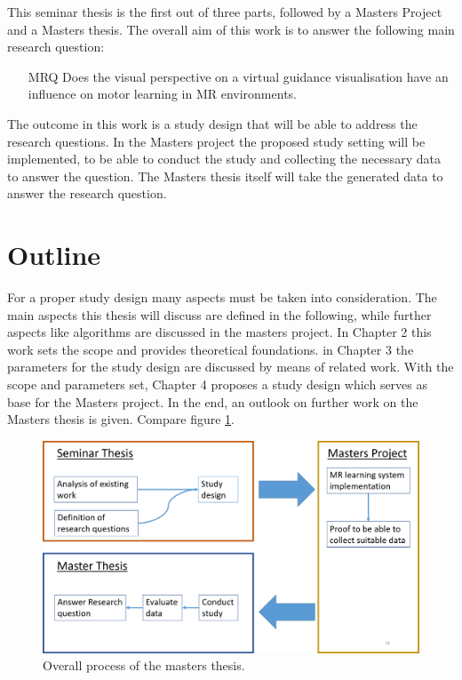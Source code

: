 This seminar thesis is the first out of three parts, followed by a Masters Project and a Masters thesis. The overall aim of this work is to answer the following main research question:
\begin{itemize}
	\item[MRQ] Does the visual perspective on a virtual guidance visualisation have an influence on motor learning in MR environments.
	
\end{itemize}
The outcome in this work is a study design that will be able to address the research questions. In the Masters project the proposed study setting will be implemented, to be able to conduct the study and collecting the necessary data to answer the question. The Masters thesis itself will take the generated data to answer the research question.


\section{Outline}
For a proper study design many aspects must be taken into consideration. The main aspects this thesis will discuss are defined in the following, while further aspects like algorithms are discussed in the masters project. In Chapter 2 this work sets the scope and provides theoretical foundations. in Chapter 3 the parameters for the study design are discussed by means of related work. With the scope and parameters set, Chapter 4 proposes a study design which serves as base for the Masters project. In the end, an outlook on further work on the Masters thesis is given. Compare figure \ref{fig:overallProcess}.
\begin{figure}
	\centering
	\includegraphics[width=1.0\textwidth]{img/overallProcess.png}
	\caption{Overall process of the masters thesis.}
	\label{fig:overallProcess}
\end{figure}\\


